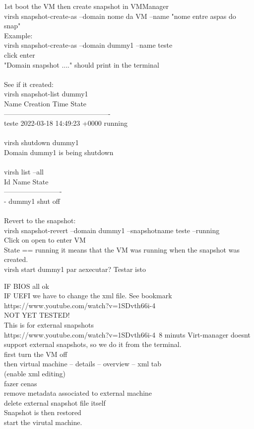 \documentclass[11pt, a4paper, oneside]{article}
\theoremstyle{definition}
\begin{document}
1st boot the VM then create snapshot in VMManager\\
virsh snapshot-create-as --domain nome da VM --name "nome entre aspas do snap"\\
Example:\\
virsh snapshot-create-as --domain dummy1 --name teste\\
click enter\\
"Domain snapshot ...." should print in the terminal\\
\\
See if it created:\\
virsh snapshot-list dummy1\\
 Name    Creation Time               State\\
----------------------------------------------\\
 teste   2022-03-18 14:49:23 +0000   running\\
\\
virsh shutdown dummy1\\
Domain dummy1 is being shutdown\\
\\
virsh list --all\\
 Id   Name     State\\
-------------------------\\
 -    dummy1   shut off\\
 \\
Revert to the snapshot:\\
virsh snapshot-revert --domain dummy1 --snapshotname teste --running\\
Click on open to enter VM\\
State == running it means that the VM was running when the snapshot was created.\\
virsh start dummy1 par aexecutar? Testar isto

IF BIOS all ok\\
IF UEFI we have to change the xml file. See bookmark https://www.youtube.com/watch?v=1SDvth66i-4\\

NOT YET TESTED!\\
This is for external snapshots\\
https://www.youtube.com/watch?v=1SDvth66i-4\
8 minuts
Virt-manager doesnt support external snapshots, so we do it from the terminal.\\
first turn the VM off\\
then virtual machine -- details -- overview -- xml tab\\
(enable xml editing)\\
fazer cenas\\
remove metadata associated to external machine\\
delete external snapshot file itself\\
Snapshot is then restored\\
start the virutal machine.\\
\end{document}
